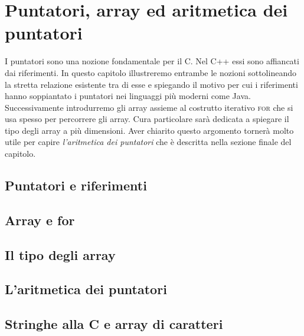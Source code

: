 \chapter{Puntatori, array ed aritmetica dei puntatori}

I puntatori sono una nozione fondamentale per il C. Nel C++ essi sono affiancati dai riferimenti. In questo capitolo illustreremo entrambe le nozioni sottolineando la stretta relazione esistente tra di esse e spiegando il motivo per cui i riferimenti hanno soppiantato i puntatori nei linguaggi più moderni come Java. Successivamente introdurremo gli array assieme al costrutto iterativo \textsc{for} che si usa spesso per percorrere gli array. Cura particolare sarà dedicata a spiegare il tipo degli array a più dimensioni. Aver chiarito questo argomento tornerà molto utile per capire \textit{l'aritmetica dei puntatori} che è descritta nella sezione finale del capitolo.

\section{Puntatori e riferimenti}

\section{Array e for}

\section{Il tipo degli array}

\section{L'aritmetica dei puntatori}

\section{Stringhe alla C e array di caratteri}

\newpage